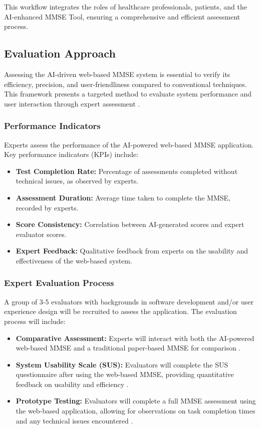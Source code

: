 This workflow integrates the roles of healthcare professionals, patients, and the AI-enhanced MMSE Tool, ensuring a comprehensive and efficient assessment process.

\subsection{Evaluation Approach}
Assessing the AI-driven web-based MMSE system is essential to verify its efficiency, precision, and user-friendliness compared to conventional techniques. This framework presents a targeted method to evaluate system performance and user interaction through expert assessment \cite{Greenhalgh2017}.

\subsubsection{Performance Indicators}
Experts assess the performance of the AI-powered web-based MMSE application. Key performance indicators (KPIs) include:
\begin{itemize}
\item \textbf{Test Completion Rate:} Percentage of assessments completed without technical issues, as observed by experts.
\item \textbf{Assessment Duration:} Average time taken to complete the MMSE, recorded by experts.
\item \textbf{Score Consistency:} Correlation between AI-generated scores and expert evaluator scores.
\item \textbf{Expert Feedback:} Qualitative feedback from experts on the usability and effectiveness of the web-based system.
\end{itemize}

\subsubsection{Expert Evaluation Process}
A group of 3-5 evaluators with backgrounds in software development and/or user experience design will be recruited to assess the application. The evaluation process will include:
\begin{itemize}
\item \textbf{Comparative Assessment:} Experts will interact with both the AI-powered web-based MMSE and a traditional paper-based MMSE for comparison \cite{Bauer2012}.
\item \textbf{System Usability Scale (SUS):} Evaluators will complete the SUS questionnaire after using the web-based MMSE, providing quantitative feedback on usability and efficiency \cite{Brooke1996}.
\item \textbf{Prototype Testing:} Evaluators will complete a full MMSE assessment using the web-based application, allowing for observations on task completion times and any technical issues encountered \cite{Zygouris2017}.
\end{itemize}

